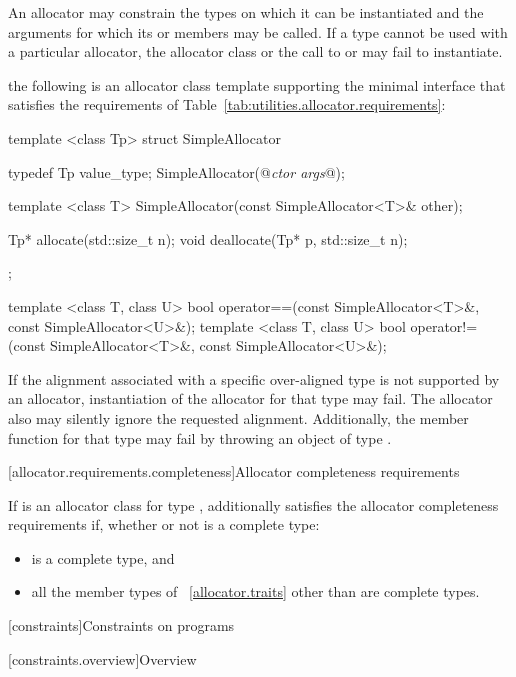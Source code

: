 \pnum
An allocator may constrain the types on which it can be instantiated and the
arguments for which its  or  members may be
called. If a type cannot be used with a particular allocator, the allocator
class or the call to  or  may fail to instantiate.

\enterexample the following is an allocator class template supporting the minimal
interface that satisfies the requirements of
Table~\ref{tab:utilities.allocator.requirements}:

\begin{codeblock}
template <class Tp>
struct SimpleAllocator {
  typedef Tp value_type;
  SimpleAllocator(@\textit{ctor args}@);

  template <class T> SimpleAllocator(const SimpleAllocator<T>& other);

  Tp* allocate(std::size_t n);
  void deallocate(Tp* p, std::size_t n);
};

template <class T, class U>
bool operator==(const SimpleAllocator<T>&, const SimpleAllocator<U>&);
template <class T, class U>
bool operator!=(const SimpleAllocator<T>&, const SimpleAllocator<U>&);
\end{codeblock}
\exitexample

\pnum
If the alignment associated with a specific over-aligned type is not
supported by an allocator, instantiation of the allocator for that type may
fail. The allocator also may silently ignore the requested alignment.
\enternote Additionally, the member function 
for that type may fail by throwing an object of type
.\exitnote

[allocator.requirements.completeness]{Allocator completeness requirements}

\pnum
If  is an allocator class for type ,
 additionally satisfies the allocator completeness requirements if,
whether or not  is a complete type:

\begin{itemize}
\item {} is a complete type, and
\item all the member types of ~\ref{allocator.traits}
  other than  are complete types.
\end{itemize}

[constraints]{Constraints on programs}

[constraints.overview]{Overview}

